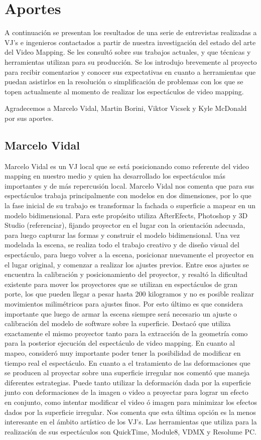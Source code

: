 ﻿\chapter{Aportes}
A continuación se presentan los resultados de una serie de entrevistas realizadas a VJ’s e ingenieros contactados a partir de nuestra investigación del estado del arte del Video Mapping. Se les consultó sobre sus trabajos actuales, y que técnicas y herramientas utilizan para su producción.
Se los introdujo brevemente al proyecto para recibir comentarios y conocer sus expectativas en cuanto a herramientas que puedan asistirlos en la resolución o simplificación de problemas con los que se topen actualmente al momento de realizar los espectáculos de video mapping.

Agradecemos a Marcelo Vidal, Martin Borini, Viktor Vicsek y Kyle McDonald por sus aportes.

\section{Marcelo Vidal}
Marcelo Vidal\cite{Chindogu} es un VJ local que se está posicionando como referente del video mapping en nuestro medio y quien ha desarrollado los espectáculos más importantes y de más repercusión local.
Marcelo Vidal nos comenta que para sus espectáculos trabaja principalmente con modelos en dos dimensiones, por lo que la fase inicial de su trabajo es transformar la fachada o superficie a mapear en un modelo bidimensional. Para este propósito utiliza AfterEfects, Photoshop y 3D Studio (referenciar), fijando proyector en el lugar con la orientación adecuada, para luego capturar las formas y construir el modelo bidimensional.
Una vez modelada la escena, se realiza todo el trabajo creativo y de diseño visual del espectáculo, para luego volver a la escena, posicionar nuevamente el proyector en el lugar original, y comenzar a realizar los ajustes previos. Entre esos ajustes se encuentra la calibración y posicionamiento del proyector, y resaltó la dificultad existente para mover los proyectores que se utilizan en espectáculos de gran porte, los que pueden llegar a pesar hasta 200 kilogramos y no es posible realizar movimientos milimétricos para ajustes finos. Por esto último es que considera importante que luego de armar la escena siempre será necesario un ajuste o calibración del modelo de software sobre la superficie. Destacó que utiliza exactamente el mismo proyector tanto para la extracción de la geometría como para la posterior ejecución del espectáculo de video mapping.
En cuanto al mapeo, consideró muy importante poder tener la posibilidad de modificar en tiempo real el espectáculo. En cuanto a el tratamiento de las deformaciones que se producen al proyectar sobre una superficie irregular nos comentó que maneja diferentes estrategias. Puede tanto utilizar la deformación dada por la superficie junto con deformaciones de la imagen o video a proyectar para lograr un efecto en conjunto, como intentar modificar el video ó imagen para minimizar los efectos dados por la superficie irregular. Nos comenta que esta última opción es la menos interesante en el ámbito artístico de los VJ’s. Las herramientas que utiliza para la realización de sus espectáculos son QuickTime, Module8, VDMX y Resolume PC.


